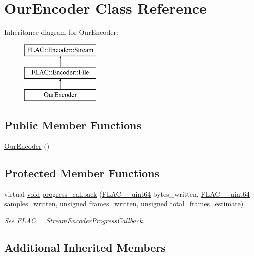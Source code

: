 \hypertarget{class_our_encoder}{}\section{Our\+Encoder Class Reference}
\label{class_our_encoder}
Inheritance diagram for Our\+Encoder\+:\begin{figure}[H]
\begin{center}
\leavevmode
\includegraphics[height=3.000000cm]{class_our_encoder}
\end{center}
\end{figure}
\subsection*{Public Member Functions}
\begin{DoxyCompactItemize}
\item 
\hyperlink{class_our_encoder_aa2af31049a348a077d4afe85474d2f7e}{Our\+Encoder} ()
\end{DoxyCompactItemize}
\subsection*{Protected Member Functions}
\begin{DoxyCompactItemize}
\item 
virtual \hyperlink{sound_8c_ae35f5844602719cf66324f4de2a658b3}{void} \hyperlink{class_our_encoder_a0f1c9e8faa23094567a4c354be8e796e}{progress\+\_\+callback} (\hyperlink{ordinals_8h_aa78c8c70a3eb8a58af7436f278acde8e}{F\+L\+A\+C\+\_\+\+\_\+uint64} bytes\+\_\+written, \hyperlink{ordinals_8h_aa78c8c70a3eb8a58af7436f278acde8e}{F\+L\+A\+C\+\_\+\+\_\+uint64} samples\+\_\+written, unsigned frames\+\_\+written, unsigned total\+\_\+frames\+\_\+estimate)
\begin{DoxyCompactList}\small\item\em See F\+L\+A\+C\+\_\+\+\_\+\+Stream\+Encoder\+Progress\+Callback. \end{DoxyCompactList}\end{DoxyCompactItemize}
\subsection*{Additional Inherited Members}


